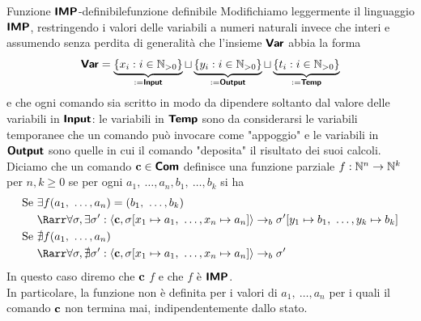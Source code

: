 \documentclass[openany]{book}
\begin{document}
\begin{definition}{Funzione $\text{\sffamily\textbf{IMP}}$-definibile}{funzione definibile}
    Modifichiamo leggermente il linguaggio $\text{\sffamily\textbf{IMP}}$, restringendo i valori delle variabili a numeri naturali invece che interi e assumendo senza perdita di generalità che l'insieme $\text{\sffamily\textbf{Var}}$ abbia la forma 
    \[ \text{\sffamily\textbf{Var}} = \underbrace{\{x_i : i \in \mathbb{N}_{> 0}\}}_{:= \text{\sffamily\textbf{Input}}} \sqcup \underbrace{\{y_i : i \in \mathbb{N}_{> 0}\}}_{:= \text{\sffamily\textbf{Output}}} \sqcup \underbrace{\{t_i : i \in \mathbb{N}_{> 0}\}}_{:= \text{\sffamily\textbf{Temp}}} \]
    e che ogni comando sia scritto in modo da dipendere soltanto dal valore delle variabili in $\text{\sffamily\textbf{Input}}$: le variabili in $\text{\sffamily\textbf{Temp}}$ sono da considerarsi le variabili temporanee che un comando può invocare come "appoggio" e le variabili in $\text{\sffamily\textbf{Output}}$ sono quelle in cui il comando "deposita" il risultato dei suoi calcoli.\\ 
    Diciamo che un comando $\mathbf{c} \in \text{\sffamily\textbf{Com}}$ definisce una funzione parziale $f : \mathbb{N}^n\to\mathbb{N}^k$ per $n,k\ge 0$ se per ogni $a_1,\ \dots,a_n,b_1,\ \dots,b_k$ si ha 
    \begin{align*}
        \text{Se } &\exists f(a_1,\ \dots ,a_n) = (b_1,\ \dots,b_k) \\
        & \Rarr \forall\sigma, \exists\sigma' : \langle \c, \sigma[x_1\mapsto a_1,\ \dots, x_n\mapsto a_n] \rangle \to_b \sigma'[y_1\mapsto b_1,\ \dots, y_k\mapsto b_k] \\
        \text{Se } & \nexists f(a_1,\ \dots , a_n ) \\
        & \Rarr \forall\sigma, \nexists\sigma' : \langle \c, \sigma[x_1\mapsto a_1,\ \dots, x_n\mapsto a_n] \rangle \to_b \sigma'
    \end{align*}
    In questo caso diremo che $\mathbf{c}$  $f$ e che $f$ è $\text{\sffamily\textbf{IMP}}$.\\
    In particolare, la funzione non è definita per i valori di $a_1,\ \dots,a_n$ per i quali il comando $\mathbf{c}$ non termina mai, indipendentemente dallo stato.
\end{definition}
\end{document}
